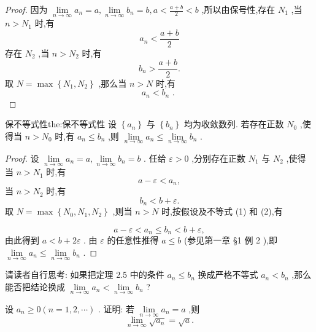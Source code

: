 \begin{proof}
因为 \(\mathop{\lim }\limits_{{n \rightarrow  \infty }}{a}_{n} = a,\mathop{\lim }\limits_{{n \rightarrow  \infty }}{b}_{n} = b,a < \frac{a + b}{2} < b\) ,所以由保号性,存在 \({N}_{1}\) ,当 \(n > {N}_{1}\) 时,有
\[
{a}_{n} < \frac{a + b}{2}
\]
存在 \({N}_{2}\) ,当 \(n > {N}_{2}\) 时,有
\[
{b}_{n} > \frac{a + b}{2}.
\]
取 \(N = \max \left\{  {{N}_{1},{N}_{2}}\right\}\) ,那么当 \(n > N\) 时,有
\[
{a}_{n} < {b}_{n}\text{ . }
\]
\end{proof}


\begin{theorem}{保不等式性}{the:保不等式性}
设 \(\left\{  {a}_{n}\right\}\) 与 \(\left\{  {b}_{n}\right\}\) 均为收敛数列. 若存在正数 \({N}_{0}\) ,使得当 \(n > {N}_{0}\) 时,有 \({a}_{n} \leq  {b}_{n}\) ,则 \(\mathop{\lim }\limits_{{n \rightarrow  \infty }}{a}_{n} \leq  \mathop{\lim }\limits_{{n \rightarrow  \infty }}{b}_{n}\) .
\end{theorem}

\begin{proof}
设 \(\mathop{\lim }\limits_{{n \rightarrow  \infty }}{a}_{n} = a,\mathop{\lim }\limits_{{n \rightarrow  \infty }}{b}_{n} = b\) . 任给 \(\varepsilon  > 0\) ,分别存在正数 \({N}_{1}\) 与 \({N}_{2}\) ,使得当 \(n > {N}_{1}\) 时,有
\[
a - \varepsilon  < {a}_{n}, \tag{1}
\]
当 \(n > {N}_{2}\) 时,有
\[
{b}_{n} < b + \varepsilon . \tag{2}
\]
取 \(N = \max \left\{  {{N}_{0},{N}_{1},{N}_{2}}\right\}\) ,则当 \(n > N\) 时,按假设及不等式 (1) 和 (2),有

\[
a - \varepsilon  < {a}_{n} \leq  {b}_{n} < b + \varepsilon ,
\]
由此得到 \(a < b + {2\varepsilon }\) . 由 \(\varepsilon\) 的任意性推得 \(a \leq  b\) (参见第一章 §1 例 2 ),即 \(\mathop{\lim }\limits_{{n \rightarrow  \infty }}{a}_{n} \leq  \mathop{\lim }\limits_{{n \rightarrow  \infty }}{b}_{n}\) .
\end{proof}


请读者自行思考: 如果把定理 2.5 中的条件 \({a}_{n} \leq  {b}_{n}\) 换成严格不等式 \({a}_{n} < {b}_{n}\) ,那么能否把结论换成 \(\mathop{\lim }\limits_{{n \rightarrow  \infty }}{a}_{n} < \mathop{\lim }\limits_{{n \rightarrow  \infty }}{b}_{n}\) ?

\begin{example}
设 \({a}_{n} \geq  0\left( {n = 1,2,\cdots }\right)\) . 证明: 若 \(\mathop{\lim }\limits_{{n \rightarrow  \infty }}{a}_{n} = a\) ,则
\[
\mathop{\lim }\limits_{{n \rightarrow  \infty }}\sqrt{{a}_{n}} = \sqrt{a}. \tag{3}
\]
\end{example}


